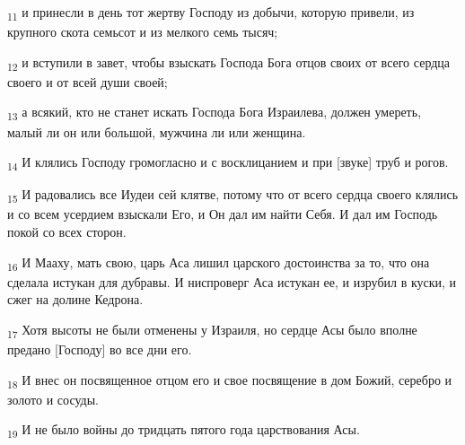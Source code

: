 \begin{tcolorbox}
\textsubscript{11} и принесли в день тот жертву Господу из добычи, которую привели, из крупного скота семьсот и из мелкого семь тысяч;
\end{tcolorbox}
\begin{tcolorbox}
\textsubscript{12} и вступили в завет, чтобы взыскать Господа Бога отцов своих от всего сердца своего и от всей души своей;
\end{tcolorbox}
\begin{tcolorbox}
\textsubscript{13} а всякий, кто не станет искать Господа Бога Израилева, должен умереть, малый ли он или большой, мужчина ли или женщина.
\end{tcolorbox}
\begin{tcolorbox}
\textsubscript{14} И клялись Господу громогласно и с восклицанием и при [звуке] труб и рогов.
\end{tcolorbox}
\begin{tcolorbox}
\textsubscript{15} И радовались все Иудеи сей клятве, потому что от всего сердца своего клялись и со всем усердием взыскали Его, и Он дал им найти Себя. И дал им Господь покой со всех сторон.
\end{tcolorbox}
\begin{tcolorbox}
\textsubscript{16} И Мааху, мать свою, царь Аса лишил царского достоинства за то, что она сделала истукан для дубравы. И ниспроверг Аса истукан ее, и изрубил в куски, и сжег на долине Кедрона.
\end{tcolorbox}
\begin{tcolorbox}
\textsubscript{17} Хотя высоты не были отменены у Израиля, но сердце Асы было вполне предано [Господу] во все дни его.
\end{tcolorbox}
\begin{tcolorbox}
\textsubscript{18} И внес он посвященное отцом его и свое посвящение в дом Божий, серебро и золото и сосуды.
\end{tcolorbox}
\begin{tcolorbox}
\textsubscript{19} И не было войны до тридцать пятого года царствования Асы.
\end{tcolorbox}
